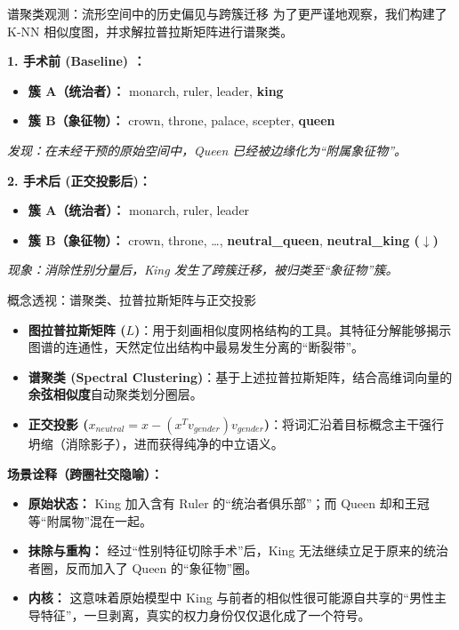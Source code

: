 \documentclass[aspectratio=169]{beamer}
\begin{document}
\begin{frame}{谱聚类观测：流形空间中的历史偏见与跨簇迁移}
    为了更严谨地观察，我们构建了 K-NN 相似度图，并求解拉普拉斯矩阵进行谱聚类。
    
    \vspace{0.2cm}
    \textbf{1. 手术前 (Baseline) ：}
    \begin{itemize}
        \item \textbf{簇 A（统治者）：} monarch, ruler, leader, \textbf{\color{blue} king}
        \item \textbf{簇 B（象征物）：} crown, throne, palace, scepter, \textbf{\color{red} queen}
    \end{itemize}
    \textit{发现：在未经干预的原始空间中，Queen 已经被边缘化为“附属象征物”。}
    
    \vspace{0.2cm}
    \textbf{2. 手术后 (正交投影后)：}
    \begin{itemize}
        \item \textbf{簇 A（统治者）：} monarch, ruler, leader
        \item \textbf{簇 B（象征物）：} crown, throne, \dots, \textbf{\color{red} neutral\_queen}, \textbf{\color{red} neutral\_king ($\downarrow$)}
    \end{itemize}
    \textit{现象：消除性别分量后，King 发生了跨簇迁移，被归类至“象征物”簇。}
\end{frame}

\begin{frame}{概念透视：谱聚类、拉普拉斯矩阵与正交投影}
    \begin{itemize}
        \item \textbf{图拉普拉斯矩阵 ($L$)}：用于刻画相似度网格结构的工具。其特征分解能够揭示图谱的连通性，天然定位出结构中最易发生分离的“断裂带”。
        \item \textbf{谱聚类 (Spectral Clustering)}：基于上述拉普拉斯矩阵，结合高维词向量的\textbf{余弦相似度}自动聚类划分圈层。
        \item \textbf{正交投影 ($x_{neutral} = x - (x^T v_{gender})v_{gender}$)}：将词汇沿着目标概念主干强行坍缩（消除影子），进而获得纯净的中立语义。
    \end{itemize}
    
    \vspace{0.3cm}
    \textbf{场景诠释（跨圈社交隐喻）：}
    \begin{itemize}
        \item \textbf{原始状态：} King 加入含有 Ruler 的“统治者俱乐部”；而 Queen 却和王冠等“附属物”混在一起。
        \item \textbf{抹除与重构：} 经过“性别特征切除手术”后，King 无法继续立足于原来的统治者圈，反而加入了 Queen 的“象征物”圈。
        \item \textbf{内核：} 这意味着原始模型中 King 与前者的相似性很可能源自共享的“男性主导特征”，一旦剥离，真实的权力身份仅仅退化成了一个符号。
    \end{itemize}
\end{frame}
\end{document}
